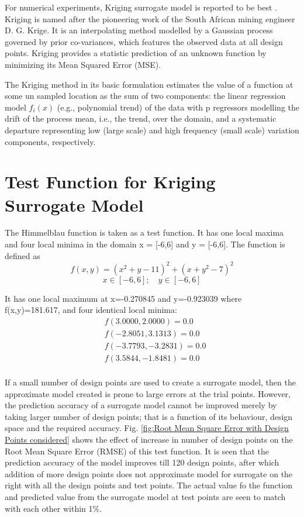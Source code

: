 For numerical experiments, Kriging surrogate model is reported to be best . Kriging is named after the pioneering work of the South African mining engineer D. G. Krige. It is an interpolating method modelled by a Gaussian process governed by prior co-variances, which features the observed data at all design points. Kriging provides a statistic prediction of an unknown function by minimizing its Mean Squared Error (MSE).

The Kriging method in its basic formulation estimates the value of a function at some un sampled location as the sum of two components: the linear regression model $ f_i (x) $ (e.g., polynomial trend) of the data with p regressors modelling the drift of the process mean, i.e., the trend, over the domain, and a systematic departure representing low (large scale) and high frequency (small scale) variation components, respectively.


\section{Test Function for Kriging Surrogate Model}
The Himmelblau function is taken as a test function.  It has one local maxima and four local minima in the domain x = [-6,6] and y = [-6,6]. The function is defined as 
\begin{equation}
f(x,y) = (x^2 + y - 11)^2  + (x + y^2 - 7)^2 
\end{equation}
\begin{equation}
x \in [-6,6] ;\quad y \in [-6,6]
\end{equation}

It has one local maximum at x=-0.270845 and y=-0.923039 where f(x,y)=181.617, and four identical local minima:
\begin{align}
&f( 3.0000 , 2.0000 )=0.0 \\
&f( -2.8051 , 3.1313 )=0.0 \\
&f( -3.7793 , -3.2831 )=0.0 \\
&f( 3.5844 , -1.8481 )=0.0 \\
\end{align}

If a small number of design points are used to create a surrogate model, then the approximate model created is prone to large errors at the trial points. However, the prediction accuracy of a surrogate model cannot be improved merely by taking larger number of design points; that is a function of its behaviour, design space and the required accuracy. Fig. \ref{fig:Root Mean Square Error with Design Points considered} shows the effect of increase in number of design points on the Root Mean Square Error (RMSE) of this test function. It is seen that the prediction accuracy of the model improves till 120 design points, after which addition of more design points does not approximate model for surrogate on the right with all the design points and test points. The actual value fo the function and predicted value from the surrogate model at test points are seen to match with each other within 1\%.

